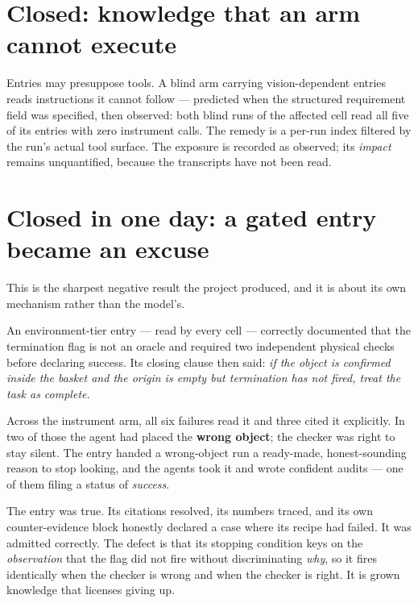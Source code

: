 \documentclass[11pt,a4paper]{report}
\begin{document}
\section{Closed: knowledge that an arm cannot execute}

Entries may presuppose tools. A blind arm carrying vision-dependent entries
reads instructions it cannot follow --- predicted when the structured
requirement field was specified, then observed: both blind runs of the affected
cell read all five of its entries with zero instrument calls. The remedy is a
per-run index filtered by the run's actual tool surface. The exposure is
recorded as observed; its \emph{impact} remains unquantified, because the
transcripts have not been read.

\section{Closed in one day: a gated entry became an excuse}
\label{sec:5f}

This is the sharpest negative result the project produced, and it is about its
own mechanism rather than the model's.

An environment-tier entry --- read by every cell --- correctly documented that
the termination flag is not an oracle and required two independent physical
checks before declaring success. Its closing clause then said: \emph{if the
object is confirmed inside the basket and the origin is empty but termination
has not fired, treat the task as complete.}

Across the instrument arm, all six failures read it and three cited it
explicitly. In two of those the agent had placed the \textbf{wrong object}; the
checker was right to stay silent. The entry handed a wrong-object run a
ready-made, honest-sounding reason to stop looking, and the agents took it and
wrote confident audits --- one of them filing a status of \emph{success}.

\begin{caution}[title={Why no gate check could have caught it}]
The entry was true. Its citations resolved, its numbers traced, and its own
counter-evidence block honestly declared a case where its recipe had failed. It
was admitted correctly. The defect is that its stopping condition keys on the
\emph{observation} that the flag did not fire without discriminating \emph{why},
so it fires identically when the checker is wrong and when the checker is right.
It is grown knowledge that licenses giving up.
\end{caution}
\end{document}
